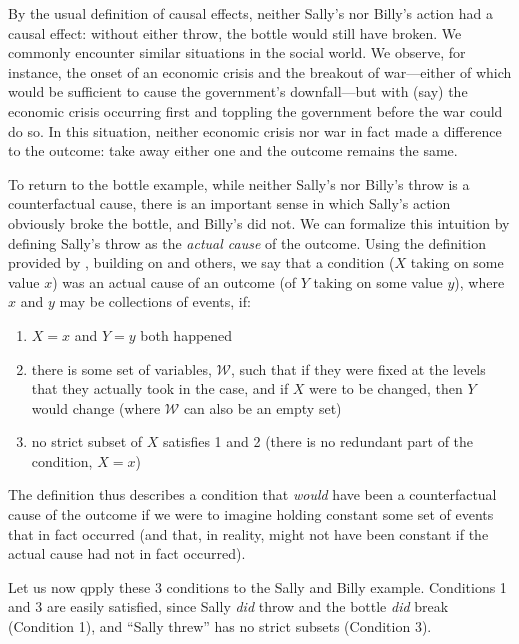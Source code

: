 \documentclass[
  12pt,
]{book}
\providecommand{\tightlist}{%
  \setlength{\itemsep}{0pt}\setlength{\parskip}{0pt}}
\begin{document}
By the usual definition of causal effects, neither Sally's nor Billy's action had a causal effect: without either throw, the bottle would still have broken. We commonly encounter similar situations in the social world. We observe, for instance, the onset of an economic crisis and the breakout of war---either of which would be sufficient to cause the government's downfall---but with (say) the economic crisis occurring first and toppling the government before the war could do so. In this situation, neither economic crisis nor war in fact made a difference to the outcome: take away either one and the outcome remains the same.

To return to the bottle example, while neither Sally's nor Billy's throw is a counterfactual cause, there is an important sense in which Sally's action obviously broke the bottle, and Billy's did not. We can formalize this intuition by defining Sally's throw as the \emph{actual cause} of the outcome. Using the definition provided by \citep{halpern2015modification}, building on \citep{halpern2005causesa} and others, we say that a condition (\(X\) taking on some value \(x\)) was an actual cause of an outcome (of \(Y\) taking on some value \(y\)), where \(x\) and \(y\) may be collections of events, if:

\begin{enumerate}
\def\labelenumi{\arabic{enumi}.}
\tightlist
\item
  \(X=x\) and \(Y=y\) both happened
\item
  there is some set of variables, \(\mathcal W\), such that if they were fixed at the levels that they actually took in the case, and if \(X\) were to be changed, then \(Y\) would change (where \(\mathcal W\) can also be an empty set)
\item
  no strict subset of \(X\) satisfies 1 and 2 (there is no redundant part of the condition, \(X=x\))
\end{enumerate}

The definition thus describes a condition that \emph{would} have been a counterfactual cause of the outcome if we were to imagine holding constant some set of events that in fact occurred (and that, in reality, might not have been constant if the actual cause had not in fact occurred).

Let us now qpply these 3 conditions to the Sally and Billy example. Conditions 1 and 3 are easily satisfied, since Sally \emph{did} throw and the bottle \emph{did} break (Condition 1), and ``Sally threw'' has no strict subsets (Condition 3).
\end{document}
